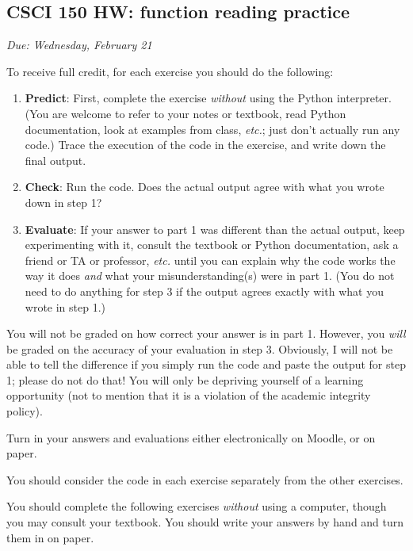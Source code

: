 \documentclass[]{article}
\date{}
\begin{document}
\subsection{CSCI 150 HW: function reading
practice}\label{csci-150-hw-function-reading-practice}

\emph{Due: Wednesday, February 21}

To receive full credit, for each exercise you should do the following:

\begin{enumerate}
\def\labelenumi{\arabic{enumi}.}
\item
  \textbf{Predict}: First, complete the exercise \emph{without} using
  the Python interpreter. (You are welcome to refer to your notes or
  textbook, read Python documentation, look at examples from class,
  \emph{etc.}; just don't actually run any code.) Trace the execution of
  the code in the exercise, and write down the final output.
\item
  \textbf{Check}: Run the code. Does the actual output agree with what
  you wrote down in step 1?
\item
  \textbf{Evaluate}: If your answer to part 1 was different than the
  actual output, keep experimenting with it, consult the textbook or
  Python documentation, ask a friend or TA or professor, \emph{etc.}
  until you can explain why the code works the way it does \emph{and}
  what your misunderstanding(s) were in part 1. (You do not need to do
  anything for step 3 if the output agrees exactly with what you wrote
  in step 1.)
\end{enumerate}

You will not be graded on how correct your answer is in part 1. However,
you \emph{will} be graded on the accuracy of your evaluation in step 3.
Obviously, I will not be able to tell the difference if you simply run
the code and paste the output for step 1; please do not do that! You
will only be depriving yourself of a learning opportunity (not to
mention that it is a violation of the academic integrity policy).

Turn in your answers and evaluations either electronically on Moodle, or
on paper.

You should consider the code in each exercise separately from the other
exercises.

You should complete the following exercises \emph{without} using a
computer, though you may consult your textbook. You should write your
answers by hand and turn them in on paper.
\end{document}
